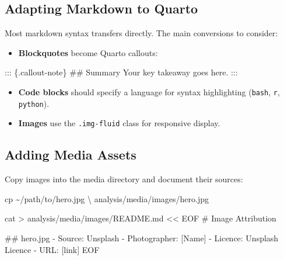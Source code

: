 \documentclass[
  letterpaper,
  DIV=11,
  numbers=noendperiod]{scrartcl}
\newenvironment{Shaded}{\begin{snugshade}}{\end{snugshade}}
\newcommand{\DataTypeTok}[1]{\textcolor[rgb]{0.68,0.00,0.00}{#1}}
\newcommand{\FunctionTok}[1]{\textcolor[rgb]{0.28,0.35,0.67}{#1}}
\newcommand{\NormalTok}[1]{\textcolor[rgb]{0.00,0.23,0.31}{#1}}
\newcommand{\OperatorTok}[1]{\textcolor[rgb]{0.37,0.37,0.37}{#1}}
\newcommand{\StringTok}[1]{\textcolor[rgb]{0.13,0.47,0.30}{#1}}
\providecommand{\tightlist}{%
  \setlength{\itemsep}{0pt}\setlength{\parskip}{0pt}}
\begin{document}
\subsection{Adapting Markdown to
Quarto}\label{adapting-markdown-to-quarto}

Most markdown syntax transfers directly. The main conversions to
consider:

\begin{itemize}
\tightlist
\item
  \textbf{Blockquotes} become Quarto callouts:
\end{itemize}

\begin{Shaded}
\begin{Highlighting}[]
\NormalTok{::: \{.callout{-}note\}}
\NormalTok{\#\# Summary}
\NormalTok{Your key takeaway goes here.}
\NormalTok{:::}
\end{Highlighting}
\end{Shaded}

\begin{itemize}
\tightlist
\item
  \textbf{Code blocks} should specify a language for syntax highlighting
  (\texttt{bash}, \texttt{r}, \texttt{python}).
\item
  \textbf{Images} use the \texttt{.img-fluid} class for responsive
  display.
\end{itemize}

\subsection{Adding Media Assets}\label{adding-media-assets}

Copy images into the media directory and document their sources:

\begin{Shaded}
\begin{Highlighting}[]
\FunctionTok{cp}\NormalTok{ \textasciitilde{}/path/to/hero.jpg }\DataTypeTok{\textbackslash{}}
\NormalTok{  analysis/media/images/hero.jpg}

\FunctionTok{cat} \OperatorTok{\textgreater{}}\NormalTok{ analysis/media/images/README.md }\OperatorTok{\textless{}\textless{} \textquotesingle{}EOF\textquotesingle{}}
\StringTok{\# Image Attribution}

\StringTok{\#\# hero.jpg}
\StringTok{{-} Source: Unsplash}
\StringTok{{-} Photographer: [Name]}
\StringTok{{-} Licence: Unsplash Licence}
\StringTok{{-} URL: [link]}
\OperatorTok{EOF}
\end{Highlighting}
\end{Shaded}
\end{document}
